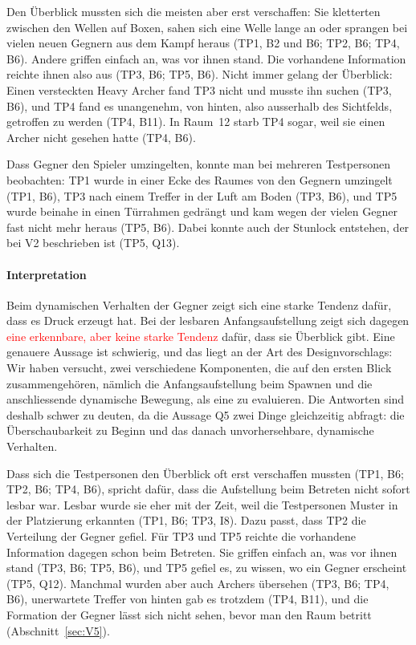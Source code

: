 \documentclass[../Main.tex]{subfiles}
\begin{document}
Den Überblick mussten sich die meisten aber erst verschaffen: Sie kletterten zwischen den Wellen auf Boxen, sahen sich eine Welle lange an oder sprangen bei vielen neuen Gegnern aus dem Kampf heraus (TP1, B2 und B6; TP2, B6; TP4, B6). Andere griffen einfach an, was vor ihnen stand. Die vorhandene Information reichte ihnen also aus (TP3, B6; TP5, B6). Nicht immer gelang der Überblick: Einen versteckten Heavy Archer fand TP3 nicht und musste ihn suchen (TP3, B6), und TP4 fand es unangenehm, von hinten, also ausserhalb des Sichtfelds, getroffen zu werden (TP4, B11). In Raum~12 starb TP4 sogar, weil sie einen Archer nicht gesehen hatte (TP4, B6).

Dass Gegner den Spieler umzingelten, konnte man bei mehreren Testpersonen beobachten: TP1 wurde in einer Ecke des Raumes von den Gegnern umzingelt (TP1, B6), TP3 nach einem Treffer in der Luft am Boden (TP3, B6), und TP5 wurde beinahe in einen Türrahmen gedrängt und kam wegen der vielen Gegner fast nicht mehr heraus (TP5, B6). Dabei konnte auch der Stunlock entstehen, der bei V2 beschrieben ist (TP5, Q13).

\paragraph{Interpretation}
Beim dynamischen Verhalten der Gegner zeigt sich eine starke Tendenz dafür, dass es Druck erzeugt hat. Bei der lesbaren Anfangsaufstellung zeigt sich dagegen \textcolor{red}{eine erkennbare, aber keine starke Tendenz} dafür, dass sie Überblick gibt. Eine genauere Aussage ist schwierig, und das liegt an der Art des Designvorschlags: Wir haben versucht, zwei verschiedene Komponenten, die auf den ersten Blick zusammengehören, nämlich die Anfangsaufstellung beim Spawnen und die anschliessende dynamische Bewegung, als eine zu evaluieren. Die Antworten sind deshalb schwer zu deuten, da die Aussage Q5 zwei Dinge gleichzeitig abfragt: die Überschaubarkeit zu Beginn und das danach unvorhersehbare, dynamische Verhalten.

Dass sich die Testpersonen den Überblick oft erst verschaffen mussten (TP1, B6; TP2, B6; TP4, B6), spricht dafür, dass die Aufstellung beim Betreten nicht sofort lesbar war. Lesbar wurde sie eher mit der Zeit, weil die Testpersonen Muster in der Platzierung erkannten (TP1, B6; TP3, I8). Dazu passt, dass TP2 die Verteilung der Gegner gefiel. Für TP3 und TP5 reichte die vorhandene Information dagegen schon beim Betreten. Sie griffen einfach an, was vor ihnen stand (TP3, B6; TP5, B6), und TP5 gefiel es, zu wissen, wo ein Gegner erscheint (TP5, Q12). Manchmal wurden aber auch Archers übersehen (TP3, B6; TP4, B6), unerwartete Treffer von hinten gab es trotzdem (TP4, B11), und die Formation der Gegner lässt sich nicht sehen, bevor man den Raum betritt (Abschnitt~\ref{sec:V5}).
\end{document}
